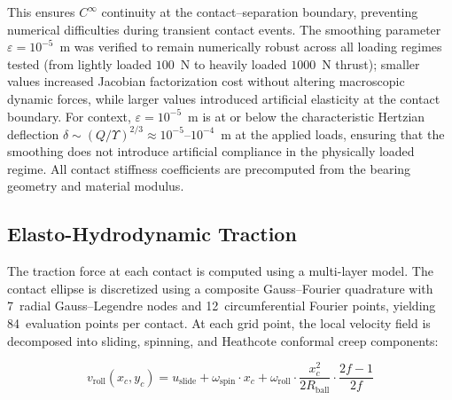 \documentclass[applsci,article,submit,pdftex,moreauthors]{Definitions/mdpi}
\begin{document}
This ensures $C^\infty$ continuity at the contact--separation boundary, preventing numerical difficulties during transient contact events. The smoothing parameter $\varepsilon = 10^{-5}$~m was verified to remain numerically robust across all loading regimes tested (from lightly loaded $100$~N to heavily loaded $1000$~N thrust); smaller values increased Jacobian factorization cost without altering macroscopic dynamic forces, while larger values introduced artificial elasticity at the contact boundary. For context, $\varepsilon = 10^{-5}$~m is at or below the characteristic Hertzian deflection $\delta \sim (Q/\Upsilon)^{2/3} \approx 10^{-5}$--$10^{-4}$~m at the applied loads, ensuring that the smoothing does not introduce artificial compliance in the physically loaded regime. All contact stiffness coefficients are precomputed from the bearing geometry and material modulus.

\subsection{Elasto-Hydrodynamic Traction}
\label{sec:ehd}

The traction force at each contact is computed using a multi-layer model. The contact ellipse is discretized using a composite Gauss--Fourier quadrature with 7~radial Gauss--Legendre nodes and 12~circumferential Fourier points, yielding 84~evaluation points per contact. At each grid point, the local velocity field is decomposed into sliding, spinning, and Heathcote conformal creep components:

\begin{linenomath}
\begin{equation}
    v_{\text{roll}}(x_c, y_c) = u_{\text{slide}} + \omega_{\text{spin}} \cdot x_c + \omega_{\text{roll}} \cdot \frac{x_c^2}{2R_{\text{ball}}} \cdot \frac{2f - 1}{2f}
    \label{eq:velocity}
\end{equation}
\end{linenomath}
\end{document}
